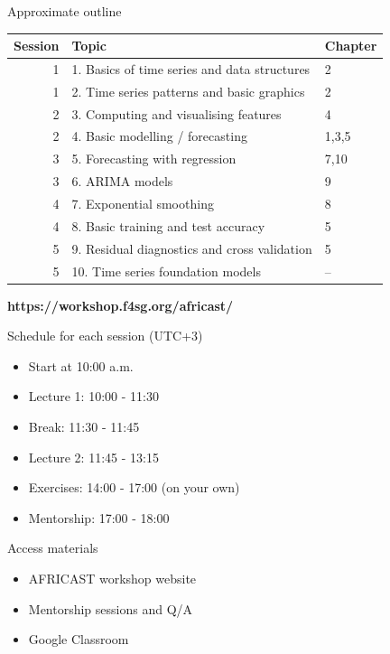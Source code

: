\documentclass[
  14pt,
  ignorenonframetext,
  aspectratio=169,
]{beamer}
\providecommand{\tightlist}{%
  \setlength{\itemsep}{0pt}\setlength{\parskip}{0pt}}
\begin{document}
\begin{frame}{Approximate outline}
\protect{}\label{approximate-outline}
\vspace*{-0.1cm}\centering\fontsize{12}{12}\sf
\begin{tabular}{rp{8.6cm}l}
  \bf Session & \bf Topic                   & \bf Chapter \\
  \midrule
  1       & 1. Basics of time series and data structures    & 2 \\
  1       & 2. Time series patterns and basic graphics      & 2 \\
  2       & 3. Computing and visualising features     & 4 \\
  2       & 4. Basic modelling / forecasting & 1,3,5 \\
  3       & 5. Forecasting with regression         & 7,10 \\
  3       & 6. ARIMA models                & 9 \\
  4       & 7. Exponential smoothing       & 8 \\
  4       & 8. Basic training and test accuracy       & 5 \\
  5       & 9. Residual diagnostics and cross validation                & 5 \\
  5       & 10. Time series foundation models              & -- \\
  \bottomrule
\end{tabular}

\vspace*{.0cm}\begin{alertblock}{}{\centerline{\Large\textbf{https://workshop.f4sg.org/africast/}}}
\end{alertblock}
\end{frame}

\begin{frame}{Schedule for each session (UTC+3)}
\protect{}\label{schedule-for-each-session-utc3}
\begin{itemize}
\tightlist
\item
  Start at 10:00 a.m.
\item
  Lecture 1: 10:00 - 11:30
\item
  Break: 11:30 - 11:45
\item
  Lecture 2: 11:45 - 13:15
\item
  Exercises: 14:00 - 17:00 (on your own)
\item
  Mentorship: 17:00 - 18:00
\end{itemize}
\end{frame}

\begin{frame}{Access materials}
\protect{}\label{access-materials}
\begin{itemize}
\tightlist
\item
  AFRICAST workshop website
\item
  Mentorship sessions and Q/A
\item
  Google Classroom
\end{itemize}
\end{frame}
\end{document}
